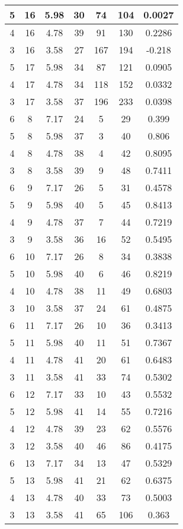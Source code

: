 \documentclass[letterpaper, 12pt]{article}
\begin{document}
\begin{longtable}{|c|c|c|c|c|c|c|}
\hline
5 & 16 & 5.98 & 30 & 74 & 104 & 0.0027 \\
\hline
4 & 16 & 4.78 & 39 & 91 & 130 & 0.2286 \\
\hline
3 & 16 & 3.58 & 27 & 167 & 194 & -0.218 \\
\hline
5 & 17 & 5.98 & 34 & 87 & 121 & 0.0905 \\
\hline
4 & 17 & 4.78 & 34 & 118 & 152 & 0.0332 \\
\hline
3 & 17 & 3.58 & 37 & 196 & 233 & 0.0398 \\
\hline
6 & 8 & 7.17 & 24 & 5 & 29 & 0.399 \\
\hline
5 & 8 & 5.98 & 37 & 3 & 40 & 0.806 \\
\hline
4 & 8 & 4.78 & 38 & 4 & 42 & 0.8095 \\
\hline
3 & 8 & 3.58 & 39 & 9 & 48 & 0.7411 \\
\hline
6 & 9 & 7.17 & 26 & 5 & 31 & 0.4578 \\
\hline
5 & 9 & 5.98 & 40 & 5 & 45 & 0.8413 \\
\hline
4 & 9 & 4.78 & 37 & 7 & 44 & 0.7219 \\
\hline
3 & 9 & 3.58 & 36 & 16 & 52 & 0.5495 \\
\hline
6 & 10 & 7.17 & 26 & 8 & 34 & 0.3838 \\
\hline
5 & 10 & 5.98 & 40 & 6 & 46 & 0.8219 \\
\hline
4 & 10 & 4.78 & 38 & 11 & 49 & 0.6803 \\
\hline
3 & 10 & 3.58 & 37 & 24 & 61 & 0.4875 \\
\hline
6 & 11 & 7.17 & 26 & 10 & 36 & 0.3413 \\
\hline
5 & 11 & 5.98 & 40 & 11 & 51 & 0.7367 \\
\hline
4 & 11 & 4.78 & 41 & 20 & 61 & 0.6483 \\
\hline
3 & 11 & 3.58 & 41 & 33 & 74 & 0.5302 \\
\hline
6 & 12 & 7.17 & 33 & 10 & 43 & 0.5532 \\
\hline
5 & 12 & 5.98 & 41 & 14 & 55 & 0.7216 \\
\hline
4 & 12 & 4.78 & 39 & 23 & 62 & 0.5576 \\
\hline
3 & 12 & 3.58 & 40 & 46 & 86 & 0.4175 \\
\hline
6 & 13 & 7.17 & 34 & 13 & 47 & 0.5329 \\
\hline
5 & 13 & 5.98 & 41 & 21 & 62 & 0.6375 \\
\hline
4 & 13 & 4.78 & 40 & 33 & 73 & 0.5003 \\
\hline
3 & 13 & 3.58 & 41 & 65 & 106 & 0.363 \\

\end{longtable}
\end{document}
